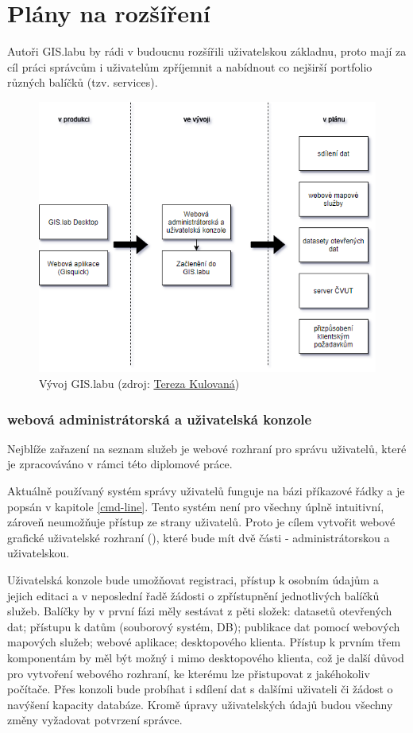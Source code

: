\section{Plány na rozšíření}
\label{vision}

Autoři GIS.labu by rádi v budoucnu rozšířili uživatelskou základnu,
proto mají za cíl práci správcům i uživatelům zpříjemnit a nabídnout
co nejširší portfolio různých balíčků (tzv. services). 

\begin{figure}[H] \centering
    \includegraphics[width=350pt]{./pictures/gislab_road_map_02.png}
    \caption[Vývoj GIS.labu]{Vývoj GIS.labu (zdroj:
	\href{}{Tereza Kulovaná})}
    \label{fig:gislab-roadmap}
\end{figure}

\subsubsection{webová administrátorská a uživatelská konzole}

Nejblíže zařazení na seznam služeb je webové rozhraní pro správu
uživatelů, které je zpracováváno v rámci této diplomové
práce. 

Aktuálně používaný systém správy uživatelů funguje na bázi
příkazové řádky a je popsán v kapitole \ref{cmd-line}. Tento systém není pro všechny úplně intuitivní, zároveň neumožňuje přístup ze strany uživatelů. Proto je cílem vytvořit webové grafické uživatelské rozhraní (), které bude mít dvě části - administrátorskou a uživatelskou.

Uživatelská konzole bude umožňovat registraci, přístup k osobním údajům a jejich editaci a v neposlední řadě žádosti o zpřístupnění jednotlivých balíčků služeb. Balíčky by v první fázi měly sestávat z pěti složek: datasetů otevřených dat; přístupu k datům (souborový systém, DB); publikace dat pomocí webových mapových služeb; webové aplikace; desktopového klienta. Přístup k prvním třem komponentám by měl být možný i mimo desktopového klienta, což je další důvod pro vytvoření webového rozhraní, ke kterému lze přistupovat z jakéhokoliv počítače. Přes konzoli bude probíhat i sdílení dat s dalšími uživateli či žádost o navýšení kapacity databáze. Kromě úpravy uživatelských údajů budou všechny změny vyžadovat potvrzení správce.

